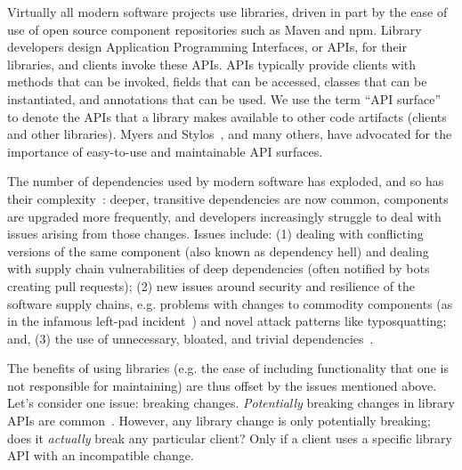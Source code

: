 \label{sec:introduction}

Virtually all modern software projects use libraries, driven in part by the ease of use of open source component repositories such as Maven and npm. Library developers design Application Programming Interfaces, or APIs, for their libraries, and clients invoke these APIs. APIs typically provide clients with methods that can be invoked, fields that can be accessed, classes that can be instantiated, and annotations that can be used. We use the term ``API surface'' to denote the APIs that a library makes available to other code artifacts (clients and other libraries). Myers and Stylos~\cite{myers-cacm-2016}, and many others, have advocated for the importance of easy-to-use and maintainable API surfaces.

The number of dependencies used by modern software has exploded, and so has their complexity~\cite{kikas2017structure,benelallam2019maven}: deeper, transitive dependencies are now common, components are upgraded more frequently, and developers increasingly struggle to deal with issues arising from those changes. Issues include: (1) dealing with conflicting versions of the same component (also known as dependency hell) and dealing with supply chain vulnerabilities of deep dependencies (often notified by bots creating pull requests); (2) new issues around security and resilience of the software supply chains, e.g. problems with changes to commodity components (as in the infamous left-pad incident~\cite{collins16:_how}) and novel attack patterns like typosquatting; and, (3) the use of unnecessary, bloated, and trivial dependencies~\cite{abdalkareem2017developers,soto2021comprehensive}.

The benefits of using libraries (e.g. the ease of including functionality that one is not responsible for maintaining) are thus offset by the issues mentioned above. 
Let's consider one issue: breaking changes. \textit{Potentially} breaking changes in library APIs are common~\cite{dietrich2014broken,raemaekers2014semantic}. However, any library change is only potentially breaking; does it \textit{actually} break any particular client? Only if a client uses a specific library API with an incompatible change.

